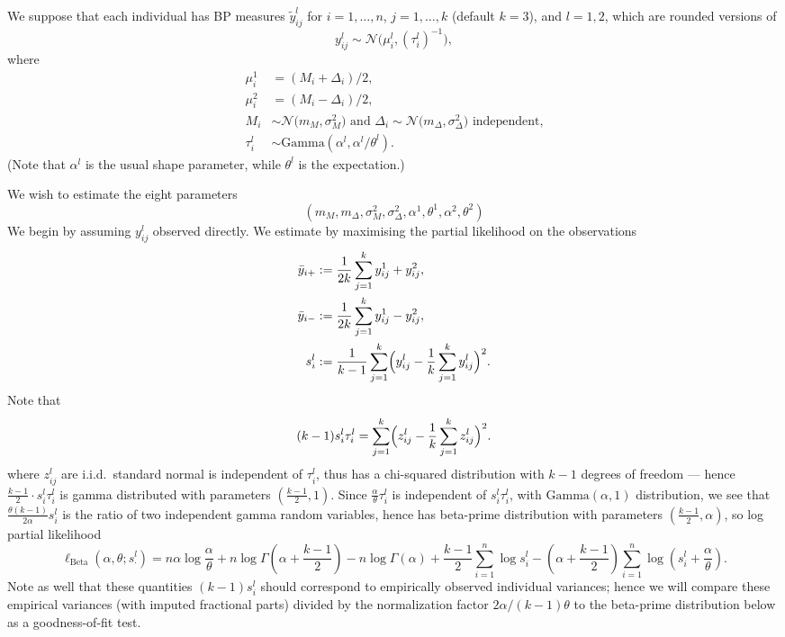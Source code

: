 \documentclass[
]{article}
\begin{document}
We suppose that each individual has BP measures \(\tilde{y}_{ij}^l\) for
\(i=1,\dots,n\), \(j=1,\dots,k\) (default \(k=3\)), and \(l=1,2\), which
are rounded versions of \[
  y_{ij}^l \sim \mathcal{N}\bigl( \mu_i^l,(\tau_i^l)^{-1}\bigr),
\] where \begin{align*}
\mu_i^1&=(M_i+\Delta_i)/2,\\
\mu_i^2&=(M_i-\Delta_i)/2,\\
M_i&\sim \mathcal{N}\bigl(m_M,\sigma^2_M) \text{ and }
  \Delta_i\sim \mathcal{N}\bigl(m_\Delta,\sigma^2_\Delta) \text{ independent,}\\
  \tau_i^l &\sim \mathrm{Gamma}(\alpha^l,\alpha^l/\theta^l ).
\end{align*} (Note that \(\alpha^l\) is the usual shape parameter, while
\(\theta^l\) is the expectation.)

We wish to estimate the eight parameters \[
(m_M,m_\Delta,\sigma^2_M,\sigma^2_\Delta,\alpha^1,\theta^1,\alpha^2,\theta^2)
\] We begin by assuming \(y_{ij}^l\) observed directly. We estimate by
maximising the partial likelihood on the observations \begin{align*}
  \bar{y}_{i+}&:= \frac{1}{2k} \sum_{j=1}^k y_{ij}^1 + y_{ij}^2,\\
  \bar{y}_{i-}&:= \frac{1}{2k} \sum_{j=1}^k y_{ij}^1 - y_{ij}^2,\\
  s_i^l&:=  \frac{1}{k-1}\sum_{j=1}^k \Bigl( y_{ij}^l - \frac{1}{k} \sum_{j=1}^k y_{ij}^l \Bigr)^2.
\end{align*} Note that \[
(k-1)s_i^l \tau_i^l =\sum_{j=1}^k \Bigl( z_{ij}^l - \frac{1}{k} \sum_{j=1}^k z_{ij}^l \Bigr)^2.
\] where \(z_{ij}^l\) are i.i.d.~standard normal is independent of
\(\tau_i^l\), thus has a chi-squared distribution with \(k-1\) degrees
of freedom --- hence \(\frac{k-1}{2}\cdot s_i^l\tau_i^l\) is gamma
distributed with parameters \((\frac{k-1}{2},1)\). Since
\(\frac{\alpha}{\theta}\tau_i^l\) is independent of \(s_i^l\tau_i^l\),
with \(\mathrm{Gamma}(\alpha,1)\) distribution, we see that
\(\frac{\theta(k-1)}{2\alpha}s_i^l\) is the ratio of two independent
gamma random variables, hence has beta-prime distribution with
parameters \(\left(\frac{k-1}{2}, \alpha \right)\), so log partial
likelihood \[
  \ell_{\operatorname{Beta}}(\alpha,\theta;s^l_\cdot)=n\alpha \log\frac{\alpha}{\theta}+n\log\Gamma\left(\alpha+\frac{k-1}{2}\right)-n\log\Gamma(\alpha)
  + \frac{k-1}{2} \sum_{i=1}^n \log s_i^l -\left(\alpha+\frac{k-1}{2}\right) \sum_{i=1}^n \log \left(s_i^l+\frac\alpha\theta\right).
\] Note as well that these quantities \((k-1)s_i^l\) should correspond
to empirically observed individual variances; hence we will compare
these empirical variances (with imputed fractional parts) divided by the
normalization factor \(2\alpha/(k-1)\theta\) to the beta-prime
distribution below as a goodness-of-fit test.
\end{document}
